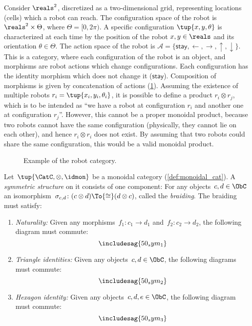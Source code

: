 \begin{example}
  \label{ex:robot}
  Consider $\reals^2$, discretized as a two-dimensional grid, representing locations (cells) which a robot can reach. The configuration space of the robot is $\reals^2\times \Theta$, where $\Theta=[0,2\pi)$. A specific configuration $\tup{x,y,\theta}$ is characterized at each time by the position of the robot $x,y\in \reals$ and its orientation $\theta \in \Theta$. The action space of the robot is $\mathcal{A}=\{\mathsf{stay},\leftarrow, \rightarrow, \uparrow, \downarrow\}$. This is a category, where each configuration of the robot is an object, and morphisms are robot actions which change configurations. Each configuration has the identity morphism which does not change it ($\mathsf{stay}$). Composition of morphisms is given by concatenation of actions (\cref{fig:robotcategory}). Assuming the existence of multiple robots $r_i=\tup{x_i,y_i,\theta_i}$, it is possible to define a product $r_i\otimes r_j$, which is to be intended as ``we have a robot at configuration $r_i$ and another one at configuration $r_j$''. However, this cannot be a proper monoidal product, because two robots cannot have the same configuration (physically, they cannot lie on each other), and hence $r_i\otimes r_i$ does not exist. By assuming that two robots could share the same configuration, this would be a valid monoidal product.
  \begin{figure}[tbh]
    \begin{center}
    \end{center}
    \caption{Example of the robot category. \label{fig:robotcategory}}
  \end{figure}
\end{example}


\begin{ctdefinition}
  Let~$\tup{\CatC,\otimes,\idmon}$ be a monoidal category (\cref{def:monoidal_cat}). A \emph{symmetric structure} on it consists of one component: For any objects~$c,d\in\ObC$ an isomorphism~$\sigma_{c,d}\colon (c\otimes d)\To{\cong}(d\otimes c)$, called the \emph{braiding}. The braiding must satisfy:
  \begin{enumerate}
    \item \emph{Naturality:} Given any morphisms~$f_1\colon c_1\to d_1$ and~$f_2\colon c_2\to d_2$, the following diagram must commute:
    \begin{equation}
      \includesag{50_sym_1}
    \end{equation}
    \item \emph{Triangle identities:} Given any objects~$c,d\in\ObC$, the following diagrams must commute:
    \begin{equation}
      \includesag{50_sym_2}
    \end{equation}
    \item \emph{Hexagon identity:} Given any objects~$c,d,e\in \ObC$, the following diagram must commute:
    \begin{equation}
      \includesag{50_sym_3}
    \end{equation}
  \end{enumerate}
\end{ctdefinition}
